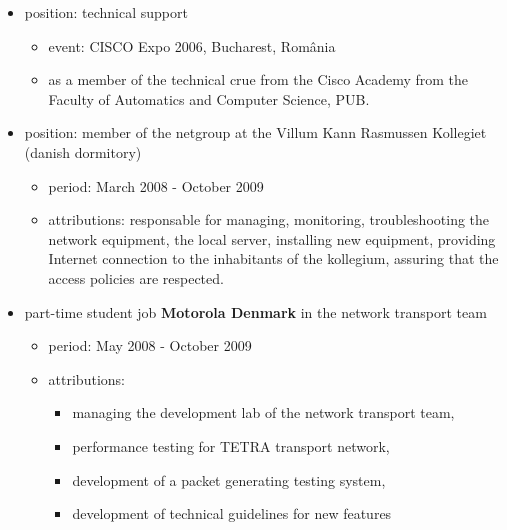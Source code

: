 \begin{itemize}
\begin{itemize}
			\end{itemize}
			\item position: technical support 
				\begin{itemize}
				 \item event: CISCO Expo 2006, Bucharest, România
                                 \item as a member of the technical crue from the Cisco Academy from the Faculty of Automatics and Computer Science, PUB.
                                \end{itemize}
			\item position: member of the netgroup at the Villum Kann Rasmussen Kollegiet (danish dormitory)
				\begin{itemize}
					\item period: March 2008 - October 2009 
					\item attributions: responsable for managing, monitoring, troubleshooting the network equipment, the local server, installing new equipment, providing Internet connection to the inhabitants of the kollegium, assuring that the access policies are respected.
				\end{itemize}
			\item part-time student job \textbf{Motorola Denmark} in the network transport team
				\begin{itemize}
					\item period: May 2008 - October 2009
					\item attributions: 
					\begin{itemize}
						\item managing the development lab of the network transport team, 
						\item performance testing for TETRA transport network, 
						\item development of a packet generating testing system, 
						\item development of technical guidelines for new features
					\end{itemize}
				\end{itemize}
		\end{itemize}	
